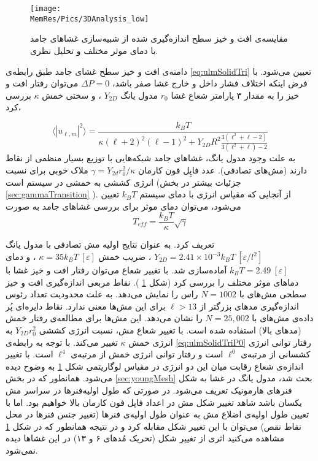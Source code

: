 \begin{figure}[htbp]
\begin{center}
\texttt{[image: \\MemRes/Pics/3DAnalysis\_low]}
\caption{
مقایسه‌ی افت و خیز سطح اندازه‌گیری شده از شبیه‌سازی غشا‌های جامد با دمای‌ موثر مختلف و تحلیل نظری.
}
\label{fig:3DAnalysis_low}
\end{center}
\end{figure}

دامنه‌ی افت و خیز سطح غشای جامد طبق رابطه‌ی 
\ref{eq:ulmSolidTri}
تعیین می‌شود. با فرض اینکه اختلاف فشار داخل و خارج غشا صفر باشد،
$\Delta P =0$
می‌توان رفتار افت و خیز را به مقدار ۳ پارامتر شعاع غشا
$r_0$
مدول یانگ 
$Y_{2D}$
، و سختی خمش 
$\kappa$
بررسی کرد، 

\begin{equation}
\langle|u_{\ell,m}|^2\rangle=\frac{k_BT}{\kappa(\ell+2)^2(\ell-1)^2+Y_{2D}R^2\frac{3(\ell^2+\ell-2)}{3(\ell^2+\ell)-2}}
\label{eq:ulmSolidTriP0}
\end{equation}
به علت وجود مدول یانگ، غشا‌های جامد شبکه‌هایی با توزیع بسیار منظمی از نقاط دارند (مش‌های تصادفی). عدد فاپِل فون کارمان
$\gamma=Y_{2d}r_0^2/\kappa$
ملاک خوبی برای نسبت انرژی کششی به خمشی در سیستم است (جزئیات بیشتر در بخش 
\ref{sec:gammaTransition}
). از آنجایی که مقیاس انرژی با دمای سیستم
$k_BT$
تعیین می‌شود، می‌توان دمای موثر برای بررسی غشاهای جامد به صورت
\cite{gomppernelson2012}
\begin{equation}
T_{eff}=\frac{k_BT}{\kappa}\sqrt{\gamma}
\label{eq:ulmSolidTriP0}
\end{equation}

تعریف کرد. به عنوان نتایج اولیه مش تصادفی با مدول یانگ
$Y_{2D}=2.41\times10^{-3}k_BT~[\varepsilon/l^2]$
، ضریب خمش
$\kappa=35k_BT~[\varepsilon]$
، و دمای 
$k_BT=2.49~[\varepsilon]$
آماده‌سازی شد. با تغییر شعاع می‌توان رفتار افت و خیز غشا‌ با دماهای موثر مختلف را بررسی کرد (شکل
\ref{fig:3DAnalysis_low}
). نقاط مربعی اندازه‌گیری افت و خیز سطحی مش‌های با 
$N=1002$
راس را نمایش می‌دهد. به علت محدودیت تعداد رئوس اندازه‌گیری مد‌های بزرگتر از 
$\ell>13$
برای این مش‌ها معنی ندارد. نقاط دایره‌ای پُر داده‌ی مش‌های با 
$N=25,002$
را نشان می‌دهد. این مش‌ها برای مطالعه‌ی رفتار خمش (مد‌های بالا) استفاده شده است. با تغییر شعاع مش، نسبت انرژی کششی 
$Y_{2D}r_0^2$
به انرژی خمش
$\kappa$
تغییر می‌کند. با توجه به رابطه‌ی
\ref{eq:ulmSolidTriP0}
رفتار توانی انرژی کشسانی از مرتبه‌ی 
$\ell^0$
است و رفتار توانی انرژی خمش از مرتبه‌ی
$\ell^4$
است. با تغییر اندازه‌ی شعاع رقابت میان این دو انرژی در مقیاس لوگاریتمی شکل
\ref{fig:3DAnalysis_low}
به وضوح دیده می‌شود. همانطور که در بخش 
\ref{sec:youngMesh}
بحث شد، مدول یانگ در غشا به شکل فنر‌های هارمونیک تعریف می‌شود. در صورتی که طول‌ اولیه‌فنر‌ها در سراسر مش یکسان باشد شاهد تغییر شکل مش در اعداد فاپل فون کارمان بالا خواهیم بود. اما با تعیین طول اولیه‌ی  اضلاع مش به عنوان طول اولیه‌ی فنرها (تغییر جنس فنر‌ها در محل نقاط نقص) می‌توان با این تغییر شکل مقابله کرد و در نتیجه همانطور که در شکل 
\ref{fig:3DAnalysis_low}
مشاهده می‌کنید اثری از تغییر شکل (تحریک مُدهای ۶ و ۱۳) در این غشا‌ها دیده نمی‌شود.


